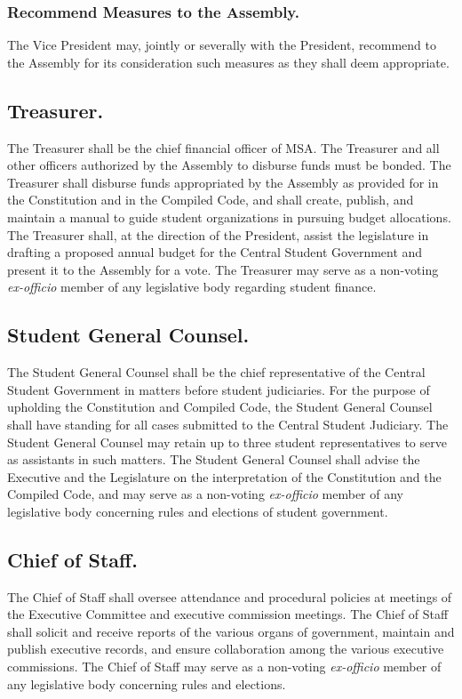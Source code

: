 \subsubsection{Recommend Measures to the Assembly.}
The Vice President may, jointly or severally with the President, recommend to the Assembly for its consideration such measures as they shall deem appropriate.


\subsection{Treasurer.}
The Treasurer shall be the chief financial officer of MSA. The Treasurer and all other officers authorized by the Assembly to disburse funds must be bonded. The Treasurer shall disburse funds appropriated by the Assembly as provided for in the Constitution and in the Compiled Code, and shall create, publish, and maintain a manual to guide student organizations in pursuing budget allocations. The Treasurer shall, at the direction of the President, assist the legislature in drafting a proposed annual budget for the Central Student Government and present it to the Assembly for a vote. The Treasurer may serve as a non-voting \textit{ex-officio} member of any legislative body regarding student finance.

\subsection{Student General Counsel.}
The Student General Counsel shall be the chief representative of the Central Student Government in matters before student judiciaries.  For the purpose of upholding the Constitution and Compiled Code, the Student General Counsel shall have standing for all cases submitted to the Central Student Judiciary.  The Student General Counsel may retain up to three student representatives to serve as assistants in such matters.  The Student General Counsel shall advise the Executive and the Legislature on the interpretation of the Constitution and the Compiled Code, and may serve as a non-voting \textit{ex-officio} member of any legislative body concerning rules and elections of student government.

\subsection{Chief of Staff.}
The Chief of Staff shall oversee attendance and procedural policies at meetings of the Executive Committee and executive commission meetings. The Chief of Staff shall solicit and receive reports of the various organs of government, maintain and publish executive records, and ensure collaboration among the various executive commissions. The Chief of Staff may serve as a non-voting \textit{ex-officio} member of any legislative body concerning rules and elections.

